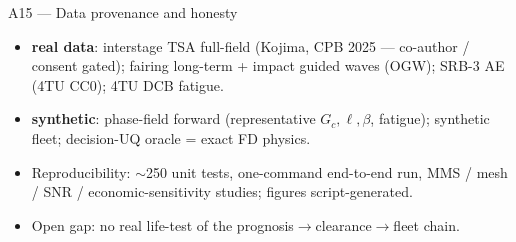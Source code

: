 \documentclass[aspectratio=169,10pt]{beamer}
\newcommand{\real}{\textcolor{okgreen}{\textbf{real data}}}
\newcommand{\synth}{\textcolor{alertred}{\textbf{synthetic}}}
\begin{document}
\begin{frame}{A15 --- Data provenance and honesty}
  \footnotesize
  \begin{itemize}
    \item \real: interstage TSA full-field (Kojima, CPB 2025 --- \alert{co-author /
          consent gated}); fairing long-term + impact guided waves (OGW);
          SRB-3 AE (4TU CC0); 4TU DCB fatigue.
    \item \synth: phase-field forward (representative $G_c,\ell,\beta$, fatigue);
          synthetic fleet; decision-UQ oracle = exact FD physics.
    \item Reproducibility: $\sim$250 unit tests, one-command end-to-end run,
          MMS / mesh / SNR / economic-sensitivity studies; figures script-generated.
    \item \alert{Open gap:} no real life-test of the prognosis$\to$clearance$\to$fleet chain.
  \end{itemize}
\end{frame}
\end{document}

